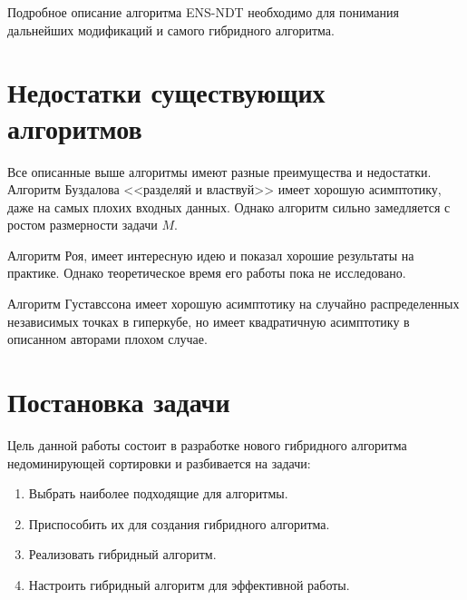 Подробное описание алгоритма ENS-NDT необходимо для понимания дальнейших модификаций и самого гибридного алгоритма.

\section{Недостатки существующих алгоритмов}

Все описанные выше алгоритмы имеют разные преимущества и недостатки. Алгоритм Буздалова <<разделяй и властвуй>> имеет хорошую асимптотику, даже на самых плохих входных данных. Однако алгоритм сильно замедляется с ростом размерности задачи $M$. 

Алгоритм Роя, имеет интересную идею и показал хорошие результаты на практике. Однако теоретическое время его работы пока не исследовано. 

Алгоритм Густавссона имеет хорошую асимптотику на случайно распределенных независимых точках в гиперкубе, но имеет квадратичную асимптотику в описанном авторами плохом случае. 

\section{Постановка задачи}

Цель данной работы состоит в разработке нового гибридного алгоритма недоминирующей сортировки и разбивается на задачи:
\begin{enumerate}
	\item Выбрать наиболее подходящие для алгоритмы.
	\item Приспособить их для создания гибридного алгоритма.
	\item Реализовать гибридный алгоритм.
	\item Настроить гибридный алгоритм для эффективной работы.
\end{enumerate}
